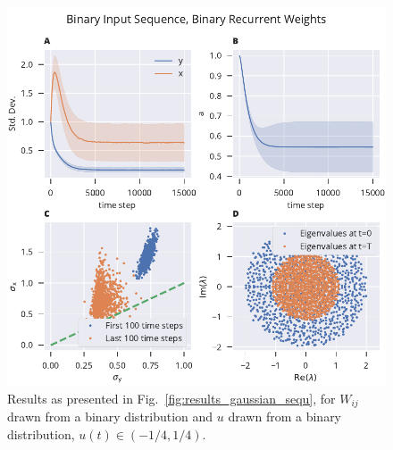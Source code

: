 \documentclass[12pt]{article}
\begin{document}
\begin{figure}[ht]
	\includegraphics{../../plots/alternative_mech/composite_binary_matrix_binary_sequence.pdf}
	\caption{Results as presented in Fig.~\ref{fig:results_gaussian_sequ}, for $W_{ij}$ drawn from a binary distribution and $u$ drawn from a binary distribution, $u(t) \in (-1/4,1/4)$.}
	\label{fig:results_binary_matrix_binary_sequence}
\end{figure}


%
%
\end{document}
